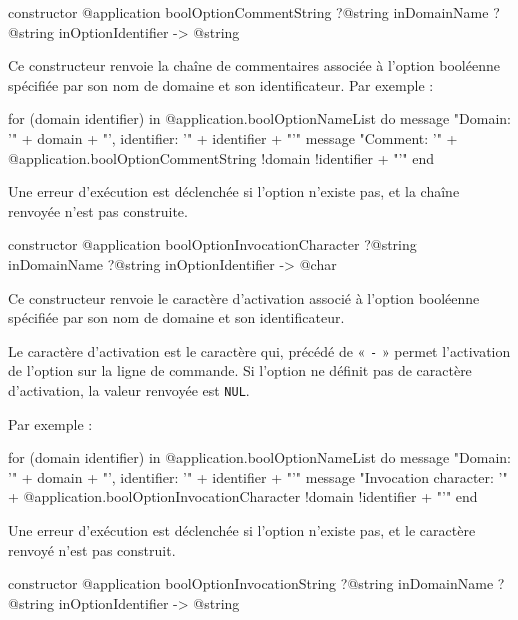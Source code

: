 
\begin{galgas4box}
constructor @application boolOptionCommentString
    ?@string inDomainName
    ?@string inOptionIdentifier -> @string
\end{galgas4box}

Ce constructeur renvoie la chaîne de commentaires associée à l'option booléenne spécifiée par son nom de domaine et son identificateur. Par exemple :
\begin{galgas4}
for (domain identifier) in @application.boolOptionNameList do
  message "Domain: '" + domain + "', identifier: '" + identifier + "'\n"
  message "Comment: '"
    + @application.boolOptionCommentString {!domain !identifier} + "'\n"
end
\end{galgas4}

Une erreur d'exécution est déclenchée si l'option n'existe pas, et la chaîne renvoyée n'est pas construite.



\begin{galgas4box}
constructor @application boolOptionInvocationCharacter
    ?@string inDomainName
    ?@string inOptionIdentifier -> @char
\end{galgas4box}

Ce constructeur renvoie le caractère d'activation associé à l'option booléenne spécifiée par son nom de domaine et son identificateur.

Le caractère d'activation est le caractère qui, précédé de « \texttt{-} » permet l'activation de l'option sur la ligne de commande. Si l'option ne définit pas de caractère d'activation, la valeur renvoyée est \texttt{NUL}.

 Par exemple :
\begin{galgas4}
for (domain identifier) in @application.boolOptionNameList do
  message "Domain: '" + domain + "', identifier: '" + identifier + "'\n"
  message "Invocation character: '"
    + @application.boolOptionInvocationCharacter {!domain !identifier} + "'\n"
end
\end{galgas4}

Une erreur d'exécution est déclenchée si l'option n'existe pas, et le caractère renvoyé n'est pas construit.



\begin{galgas4box}
constructor @application boolOptionInvocationString
    ?@string inDomainName
    ?@string inOptionIdentifier -> @string
\end{galgas4box}


